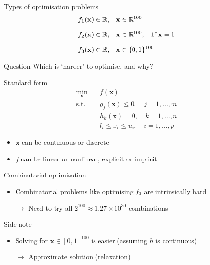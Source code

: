 \documentclass[12pt,aspectratio=169]{beamer}
\renewcommand{\vec}[1]{\ensuremath{\mathbf{#1}}}
\newcommand{\tr}{\ensuremath{\intercal}}
\newcommand{\R}{\ensuremath{\mathbb{R}}}
\begin{document}
\begin{frame}{Types of optimisation problems}
    \begin{align*}
        f_{1}(\vec{x}) \in \R \text{,} \quad & \vec{x} \in \R^{100} \\[\medskipamount]
        f_{2}(\vec{x}) \in \R \text{,} \quad & \vec{x} \in \R^{100} \text{,} \quad \vec{1}^{\tr} \vec{x} = 1 \\[\medskipamount]
        f_{3}(\vec{x}) \in \R \text{,} \quad & \vec{x} \in \{0, 1\}^{100}
    \end{align*}
    \vfill
    \begin{block}{Question}
        Which is `harder' to optimise, and why?
    \end{block}
\end{frame}

\begin{frame}{Standard form}
    \begin{align*}
        \min_{\vec{x}} \quad& f(\vec{x}) \\
        \mathup{s.t.}  \quad& g_{j}(\vec{x}) \leq 0,       \quad j = 1, \ldots, m \\
                            & h_{k}(\vec{x}) = 0,          \quad k = 1, \ldots, n \\
                            & l_{i} \leq x_{i} \leq u_{i}, \quad i = 1, \ldots, p
    \end{align*}
    \vfill
    \begin{itemize}
        \item $\vec{x}$ can be continuous or discrete
        \item $f$ can be linear or nonlinear, explicit or implicit
    \end{itemize}
\end{frame}

\begin{frame}{Combinatorial optimisation}
    \begin{itemize}
        \item Combinatorial problems like optimising $f_{3}$ are intrinsically
              hard
        \item[$\to$] Need to try all $2^{100} \approx 1.27 \times 10^{30}$
                     combinations
    \end{itemize}
    \vfill
    \begin{block}{Side note}
        \begin{itemize}
            \item Solving for $\vec{x} \in [0, 1]^{100}$ is easier
                  (assuming $h$ is continuous)
            \item[$\to$] Approximate solution (relaxation)
        \end{itemize}
    \end{block}
\end{frame}
\end{document}
